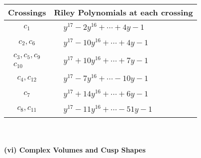\documentclass[1p]{elsarticle_modified}
\theoremstyle{definition}
\begin{document}
\begin{tabular}{m{50pt}|m{274pt}}
Crossings & \hspace{64pt}Riley Polynomials at each crossing \\
\hline $$\begin{aligned}c_{1}\end{aligned}$$&$\begin{aligned}
&y^{17}-2 y^{16}+\cdots+4 y-1
\end{aligned}$\\
\hline $$\begin{aligned}c_{2},c_{6}\end{aligned}$$&$\begin{aligned}
&y^{17}-10 y^{16}+\cdots+4 y-1
\end{aligned}$\\
\hline $$\begin{aligned}c_{3},c_{5},c_{9}\\c_{10}\end{aligned}$$&$\begin{aligned}
&y^{17}+10 y^{16}+\cdots+7 y-1
\end{aligned}$\\
\hline $$\begin{aligned}c_{4},c_{12}\end{aligned}$$&$\begin{aligned}
&y^{17}-7 y^{16}+\cdots-10 y-1
\end{aligned}$\\
\hline $$\begin{aligned}c_{7}\end{aligned}$$&$\begin{aligned}
&y^{17}+14 y^{16}+\cdots+6 y-1
\end{aligned}$\\
\hline $$\begin{aligned}c_{8},c_{11}\end{aligned}$$&$\begin{aligned}
&y^{17}-11 y^{16}+\cdots-51 y-1
\end{aligned}$\\
\hline
\end{tabular}\\~\\
\newpage\flushleft \textbf{(vi) Complex Volumes and Cusp Shapes}
\end{document}
